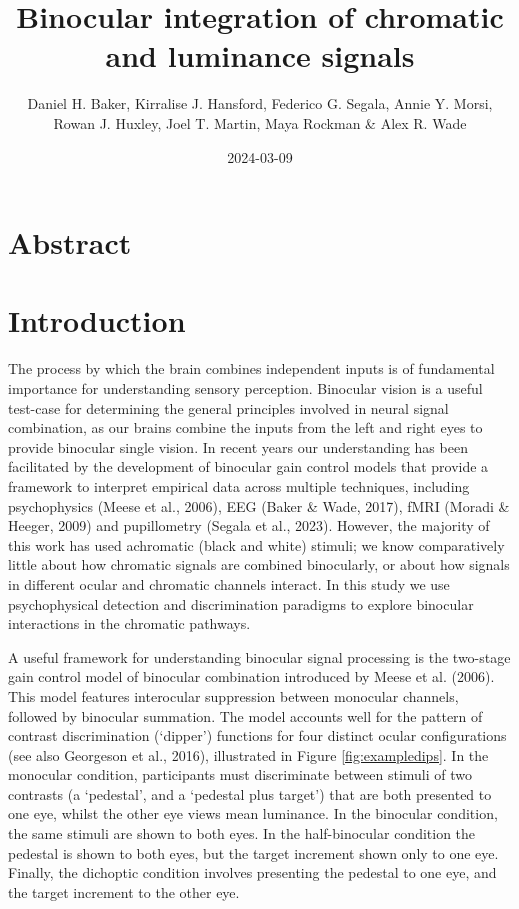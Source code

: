 \documentclass[
]{article}
\title{Binocular integration of chromatic and luminance signals}
\author{Daniel H. Baker, Kirralise J. Hansford, Federico G. Segala, Annie Y. Morsi,\\
Rowan J. Huxley, Joel T. Martin, Maya Rockman \& Alex R. Wade}
\date{2024-03-09}
\begin{document}
\maketitle

\hypertarget{abstract}{%
\section{Abstract}\label{abstract}}

\hypertarget{introduction}{%
\section{Introduction}\label{introduction}}

The process by which the brain combines independent inputs is of fundamental importance for understanding sensory perception. Binocular vision is a useful test-case for determining the general principles involved in neural signal combination, as our brains combine the inputs from the left and right eyes to provide binocular single vision. In recent years our understanding has been facilitated by the development of binocular gain control models that provide a framework to interpret empirical data across multiple techniques, including psychophysics (Meese et al., 2006), EEG (Baker \& Wade, 2017), fMRI (Moradi \& Heeger, 2009) and pupillometry (Segala et al., 2023). However, the majority of this work has used achromatic (black and white) stimuli; we know comparatively little about how chromatic signals are combined binocularly, or about how signals in different ocular and chromatic channels interact. In this study we use psychophysical detection and discrimination paradigms to explore binocular interactions in the chromatic pathways.

A useful framework for understanding binocular signal processing is the two-stage gain control model of binocular combination introduced by Meese et al. (2006). This model features interocular suppression between monocular channels, followed by binocular summation. The model accounts well for the pattern of contrast discrimination (`dipper') functions for four distinct ocular configurations (see also Georgeson et al., 2016), illustrated in Figure \ref{fig:exampledips}. In the monocular condition, participants must discriminate between stimuli of two contrasts (a `pedestal', and a `pedestal plus target') that are both presented to one eye, whilst the other eye views mean luminance. In the binocular condition, the same stimuli are shown to both eyes. In the half-binocular condition the pedestal is shown to both eyes, but the target increment shown only to one eye. Finally, the dichoptic condition involves presenting the pedestal to one eye, and the target increment to the other eye.
\end{document}
